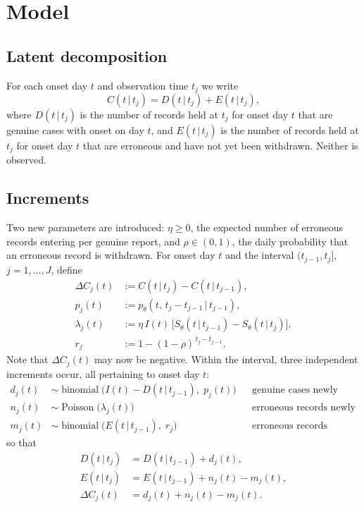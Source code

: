 \documentclass[11pt,a4paper]{article}
\newcommand{\given}{\,|\,}
\newcommand{\bin}{\operatorname{binomial}}
\newcommand{\pois}{\operatorname{Poisson}}
\begin{document}
\section{Model}

\subsection{Latent decomposition}

For each onset day $t$ and observation time $t_j$ we write
\begin{equation}\label{eq:decomp}
C(t\given t_j) = D(t\given t_j) + E(t\given t_j),
\end{equation}
where $D(t\given t_j)$ is the number of records held at $t_j$ for onset day $t$
that are genuine cases with onset on day $t$, and $E(t\given t_j)$ is the number
of records held at $t_j$ for onset day $t$ that are erroneous and have not yet
been withdrawn. Neither is observed.

\subsection{Increments}

Two new parameters are introduced: $\eta\ge 0$, the expected number of
erroneous records entering per genuine report, and $\rho\in(0,1)$, the daily
probability that an erroneous record is withdrawn. For onset day $t$ and the
interval $(t_{j-1},t_j]$, $j=1,\dots,J$, define
\begin{align}
\Delta C_j(t) &:= C(t\given t_j) - C(t\given t_{j-1}), \\
p_j(t) &:= p_\theta(t,\, t_j-t_{j-1}\given t_{j-1}), \\
\lambda_j(t) &:= \eta\, I(t)\,\bigl[S_\theta(t\given t_{j-1}) - S_\theta(t\given t_j)\bigr], \\
r_j &:= 1-(1-\rho)^{\,t_j-t_{j-1}}.
\end{align}
Note that $\Delta C_j(t)$ may now be negative. Within the interval, three
independent increments occur, all pertaining to onset day $t$:
\begin{align}
d_j(t) &\sim \bin\bigl(I(t) - D(t\given t_{j-1}),\; p_j(t)\bigr)
  && \text{genuine cases newly reported,} \label{eq:d}\\
n_j(t) &\sim \pois\bigl(\lambda_j(t)\bigr)
  && \text{erroneous records newly entered,} \label{eq:n}\\
m_j(t) &\sim \bin\bigl(E(t\given t_{j-1}),\; r_j\bigr)
  && \text{erroneous records withdrawn,} \label{eq:m}
\end{align}
so that
\begin{align}
D(t\given t_j) &= D(t\given t_{j-1}) + d_j(t), \\
E(t\given t_j) &= E(t\given t_{j-1}) + n_j(t) - m_j(t), \\
\Delta C_j(t) &= d_j(t) + n_j(t) - m_j(t). \label{eq:deltaC}
\end{align}
\end{document}
